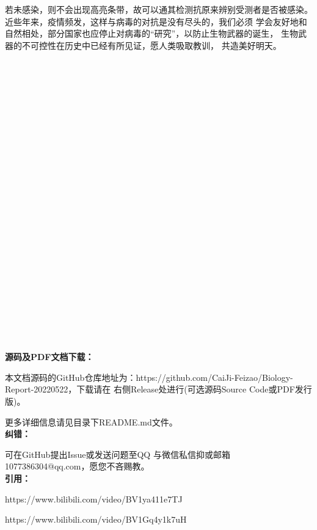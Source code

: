 \documentclass[UTF8,a4paper,11 pt]{ctexart}%
\begin{document}
	若未感染，则不会出现高亮条带，故可以通其检测抗原来辨别受测者是否被感染。
	\clearpage
	近些年来，疫情频发，这样与病毒的对抗是没有尽头的，我们必须
	学会友好地和自然相处，部分国家也应停止对病毒的“研究”，以防止生物武器的诞生，
	生物武器的不可控性在历史中已经有所见证，愿人类吸取教训，
	共造美好明天。
	\\\,\\\,\\\,\\\,\\\,\\\,\\\,
	\\\,\\\,\\\,\\\,\\\,\\\,\\\,
	\\\,\\\,\\\,\\\,\\\,\\\,\\\,
	\\\,\\\,\\\,\\\,
	\\\textbf{源码及PDF文档下载：}
	
	本文档源码的GitHub仓库地址为：https://github.com/CaiJi-Feizao/Biology-Report-20220522，下载请在
	右侧Release处进行(可选源码Source Code或PDF发行版)。
	
	更多详细信息请见目录下README.md文件。
	\\\textbf{纠错：}
	
	可在GitHub提出Issue或发送问题至QQ
	与微信私信抑或邮箱1077386304@qq.com，愿您不吝赐教。
	\\\textbf{引用：}
	
	https://www.bilibili.com/video/BV1ya411e7TJ
	
	https://www.bilibili.com/video/BV1Gq4y1k7uH
\end{document}
